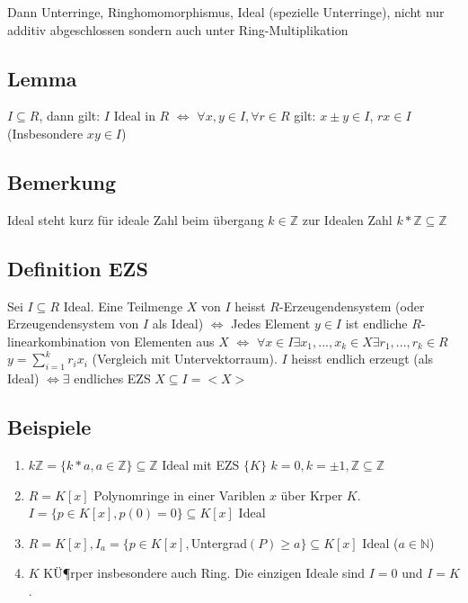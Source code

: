 \documentclass[12pt,a4paper,ngerman]{scrreprt}
\begin{document}
Dann Unterringe, Ringhomomorphismus, Ideal (spezielle Unterringe), nicht nur additiv abgeschlossen sondern auch unter Ring-Multiplikation

\subsection{Lemma}
$I \subseteq R$, dann gilt: $I$ Ideal in $R$ $\Leftrightarrow$
$\forall x,y \in I, \forall r \in R$ gilt: $x \pm y \in I$, $rx \in I$ (Insbesondere $xy \in I$)

\subsection{Bemerkung}
Ideal steht kurz für ideale Zahl beim übergang $k \in \mathbb{Z}$ zur Idealen Zahl $k*\mathbb{Z} \subseteq \mathbb{Z}$
\subsection{Definition EZS}
Sei $I \subseteq R$ Ideal. Eine Teilmenge $X$ von $I$ heisst $R$-Erzeugendensystem (oder Erzeugendensystem von $I$ als Ideal) $\Leftrightarrow$
Jedes Element $y \in I$ ist endliche $R$-linearkombination von Elementen aus $X$ 
$\Leftrightarrow$ $\forall x \in I \exists x_1,...,x_k \in X \exists r_1,...,r_k \in R$
$y = \sum_{i=1}^k r_ix_i$ (Vergleich mit Untervektorraum). %
$I$ heisst endlich erzeugt (als Ideal) $\Leftrightarrow \exists$ endliches EZS $X \subseteq I = <X>$ %

\subsection{Beispiele}
\begin{enumerate}[(1)]
\item $k \mathbb{Z} = \{k*a, a\in \mathbb{Z} \} \subseteq \mathbb{Z}$ Ideal mit EZS $\{K\}$ %
$k = 0, k = \pm 1, \mathbb{Z} \subseteq \mathbb{Z}$
\item $R=K[x]$ Polynomringe in einer Variblen $x$ über Krper $K$. $I=\{p \in K[x], p(0)=0\} \subseteq K[x]$ Ideal
\item $R=K[x], I_a = \{p\in K[x], $Untergrad$(P) \geq a\} \subseteq K[x]$ Ideal ($a \in \mathbb{N}$)
\item $K$ KÜ¶rper insbesondere auch Ring. Die einzigen Ideale sind $I=0$ und $I=K$.
\end{enumerate}
\end{document}
